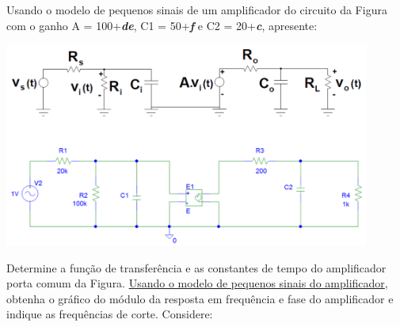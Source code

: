 \documentclass[addpoints]{exam}
\begin{document}
\begin{questions}

\question Usando o modelo de pequenos sinais de um amplificador do circuito da Figura com o ganho A = 100+\textit{\textbf{de}}, C1 = 50+\textit{\textbf{f}} e C2 = 20+\textit{\textbf{c}}, apresente:


\begin{center}
\includegraphics[width=0.9\textwidth]{imagens/1.png}
\end{center}

\question[4] Determine a função de transferência e as constantes de tempo do amplificador porta comum da Figura. \underline{Usando o modelo de pequenos sinais do amplificador}, obtenha o gráfico do módulo da resposta em frequência e fase do amplificador e indique as frequências de corte. Considere:


\end{questions}
\end{document}
